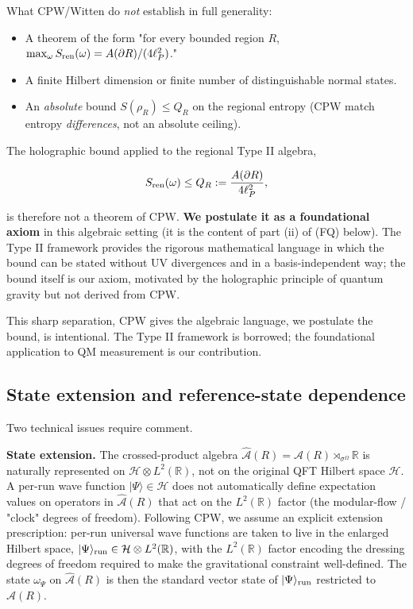 \documentclass[11pt,a4paper]{article}
\begin{document}
What CPW/Witten do \emph{not} establish in full generality:

\begin{itemize}
  \item A theorem of the form "for every bounded region $R$, $\max_{\omega} S_{\rm ren}(\omega) = A(\partial R)/(4\ell_P^2)$."
  \item A finite Hilbert dimension or finite number of distinguishable normal states.
  \item An \emph{absolute} bound $S(\rho_R) \le Q_R$ on the regional entropy (CPW match entropy \emph{differences}, not an absolute ceiling).
\end{itemize}

The holographic bound applied to the regional Type II algebra,

\[
S_{\rm ren}(\omega) \le Q_R := \frac{A(\partial R)}{4 \ell_P^2},
\]

is therefore not a theorem of CPW. \textbf{We postulate it as a foundational axiom} in this algebraic setting (it is the content of part (ii) of (FQ) below). The Type II framework provides the rigorous mathematical language in which the bound can be stated without UV divergences and in a basis-independent way; the bound itself is our axiom, motivated by the holographic principle of quantum gravity but not derived from CPW.

This sharp separation, CPW gives the algebraic language, we postulate the bound, is intentional. The Type II framework is borrowed; the foundational application to QM measurement is our contribution.

\subsection{State extension and reference-state dependence}

Two technical issues require comment.

\textbf{State extension.} The crossed-product algebra $\hat{\mathcal{A}}(R) = \mathcal{A}(R) \rtimes_{\sigma^\Omega} \mathbb{R}$ is naturally represented on $\mathcal{H} \otimes L^2(\mathbb{R})$, not on the original QFT Hilbert space $\mathcal{H}$. A per-run wave function $|\Psi\rangle \in \mathcal{H}$ does not automatically define expectation values on operators in $\hat{\mathcal{A}}(R)$ that act on the $L^2(\mathbb{R})$ factor (the modular-flow / "clock" degrees of freedom). Following CPW, we assume an explicit extension prescription: per-run universal wave functions are taken to live in the enlarged Hilbert space, $|\Psi\rangle_{\rm run} \in \mathcal{H} \otimes L^2(\mathbb{R})$, with the $L^2(\mathbb{R})$ factor encoding the dressing degrees of freedom required to make the gravitational constraint well-defined. The state $\omega_\Psi$ on $\hat{\mathcal{A}}(R)$ is then the standard vector state of $|\Psi\rangle_{\rm run}$ restricted to $\hat{\mathcal{A}}(R)$.
\end{document}
